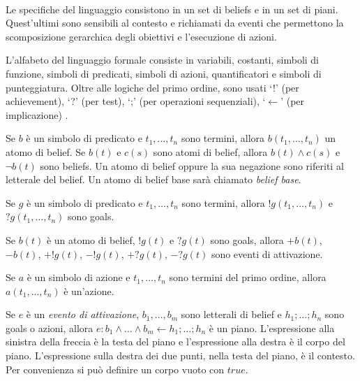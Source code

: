 \paragraph*{}
Le specifiche del linguaggio consistono in un set di beliefs e in un set di piani. Quest'ultimi sono sensibili al contesto e richiamati da eventi che permettono la scomposizione gerarchica degli obiettivi e l'esecuzione di azioni.

L'alfabeto del linguaggio formale consiste in variabili, costanti, simboli di funzione, simboli di predicati, simboli di azioni, quantificatori e simboli di punteggiatura. Oltre alle logiche del primo ordine, sono usati `!' (per achievement), `?' (per test), `;' (per operazioni sequenziali), `$\leftarrow$' (per implicazione) \cite{AgentSpeak}.

\smallskip
\begin{defn}
Se $b$ è un simbolo di predicato e $t_1, \ldots, t_n$ sono termini, allora $b(t_1, \ldots, t_n)$ un atomo di belief. Se $b(t)$ e $c(s)$ sono atomi di belief, allora $b(t) \wedge c(s)$ e $\neg b(t)$ sono beliefs. Un atomo di belief oppure la sua negazione sono riferiti al letterale del belief. Un atomo di belief base sarà chiamato \emph{belief base}.
\end{defn}

\smallskip
\begin{defn}
Se $g$ è un simbolo di predicato e $t_1, \ldots, t_n$ sono termini, allora $!g(t_1, \ldots, t_n)$ e $?g(t_1, \ldots, t_n)$ sono goals.
\end{defn}

\smallskip
\begin{defn}
Se $b(t)$ è un atomo di belief, $!g(t)$ e $?g(t)$ sono goals, allora $+b(t)$, $-b(t)$, $+!g(t)$, $-!g(t)$, $+?g(t)$, $-?g(t)$ sono eventi di attivazione.
\end{defn}

\smallskip
\begin{defn}
Se $a$ è un simbolo di azione e $t_1, \ldots, t_n$ sono termini del primo ordine, allora $a(t_1, \ldots, t_n)$ è un'azione.
\end{defn}

\smallskip
\begin{defn}
Se $e$ è un \textit{evento di attivazione}, $b_1, \ldots, b_m$ sono letterali di belief e $h_1; \ldots; h_n$ sono goals o azioni, allora $e : b_1 \land \ldots \land b_m \leftarrow h_1; \ldots; h_n$ è un piano. L'espressione alla sinistra della freccia è la testa del piano e l'espressione alla destra è il corpo del piano. L'espressione sulla destra dei due punti, nella testa del piano, è il contesto. Per convenienza si può definire un corpo vuoto con $true$.
\end{defn}

